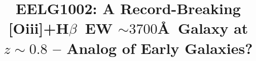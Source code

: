 \documentclass[twocolumn,tight,times,linenumbers]{aastex631}
\newcommand{\hbeta}{H$\beta$}
\newcommand{\oiii}{[O{\sc iii}]}
\begin{document}
			
			\title{EELG1002: A Record-Breaking \oiii+\hbeta~EW $\sim3700$\AA~Galaxy at $z \sim 0.8$ -- Analog of Early Galaxies?}
			
			
			
\end{document}
